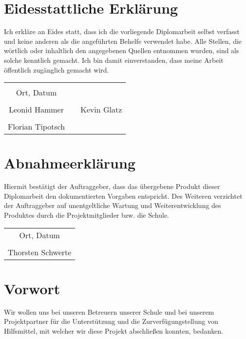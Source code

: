 \chapter*{Eidesstattliche Erklärung}
Ich erkläre an Eides statt, dass ich die vorliegende Diplomarbeit selbst verfasst und keine anderen als die angeführten Behelfe verwendet habe. Alle Stellen, die wörtlich oder inhaltlich den angegebenen Quellen entnommen wurden, sind als solche kenntlich gemacht.
Ich bin damit einverstanden, dass meine Arbeit öffentlich zugänglich gemacht wird.

\vspace{1cm}
\begin{tabular}{c c c}
	& \hspace{4cm} & \\\cline{1-1}
	Ort, Datum & & \\
	\vspace{2cm}
	& & \\\cline{1-1}\cline{3-3}
	Leonid Hammer & & Kevin Glatz \\ 
	\vspace{2cm}
	& & \\\cline{1-1}
	 Florian Tipotsch
\end{tabular}

\chapter*{Abnahmeerklärung}
Hiermit bestätigt der Auftraggeber, dass das übergebene Produkt dieser Diplomarbeit den dokumentierten Vorgaben entspricht. Des Weiteren verzichtet der Auftraggeber auf unentgeltliche Wartung und Weiterentwicklung des Produktes durch die Projektmitglieder bzw. die Schule.

\vspace{1cm}
\begin{tabular}{c}
	\\\cline{1-1}
	Ort, Datum\\
	\vspace{2cm}
	\\\cline{1-1}
	Thorsten Schwerte
\end{tabular}	

\chapter*{Vorwort}
Wir wollen uns bei unseren Betreuern unserer Schule und bei unserem Projektpartner für die Unterstützung und die Zurverfügungstellung von Hilfsmittel, mit welcher wir diese Projekt abschließen konnten, bedanken.


